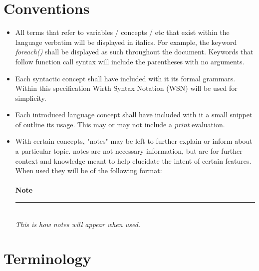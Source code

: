 \documentclass[12pt,letterpaper]{report}
\newcommand{\noteline}{\noindent\textbf{Note}\\\noindent\rule{5cm}{0.4pt}\\}
\begin{document}
\section{Conventions}
\begin{itemize}
  \item All terms that refer to variables / concepts / etc that exist within the language verbatim will 
  be displayed in italics. For example, the keyword \textit{foreach()} shall be displayed as such 
  throughout the document. Keywords that follow function call syntax will include the parentheses with 
  no arguments.
  
  \item Each syntactic concept shall have included with it its formal grammars. Within this specification 
  Wirth Syntax Notation (WSN) will be used for simplicity.

  \item Each introduced language concept shall have included with it a small snippet of outline its usage. This 
  may or may not include a \textit{print} evaluation.

  

  \item With certain concepts, "notes" may be left to further explain or inform about a particular topic. notes are 
        not necessary information, but are for further context and knowledge meant to help elucidate the 
        intent of certain features. When used they will be of the following format:\\\\
  \noteline
  \textit{This is how notes will appear when used.}

\end{itemize}
\section{Terminology}
\end{document}
